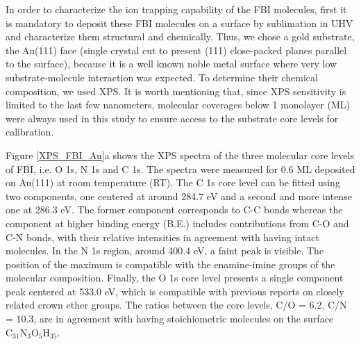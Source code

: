 \documentclass[aps,prl,reprint,longbibliography,superscriptaddress, english]{revtex4-1}
\begin{document}
In order to characterize the ion trapping capability of the FBI molecules, first it is mandatory to deposit these FBI molecules on a surface by sublimation in UHV and characterize them structural and chemically. Thus, we chose a gold substrate, the Au(111) face (single crystal cut to present (111) close-packed planes parallel to the surface), because it is a well known noble metal surface where very low substrate-molecule interaction was expected. To determine their chemical composition, we used XPS. It is worth mentioning that, since XPS sensitivity is limited to the last few nanometers, molecular coverages below 1 monolayer (ML) were always used in this study to ensure access to the substrate core levels for calibration. 

Figure {\ref{XPS_FBI_Au}}a shows the XPS spectra of the three molecular core levels of FBI, i.e. O 1s, N 1s and C 1s. The spectra were measured for 0.6 ML deposited on Au(111) at room temperature (RT). The C 1s core level can be fitted using two components, one {centered} at around 284.7 eV and a second and more intense one at 286.3 eV. The former component corresponds to C-C bonds whereas the component at higher binding energy (B.E.) includes contributions from C-O and C-N bonds, with their relative intensities in agreement with having intact molecules. In the N 1s region, around 400.4 eV, a faint peak is visible. The position of the maximum is compatible with the {enamine-imine} groups of the molecular composition. Finally, the O 1s core level presents a single component peak centered at 533.0 eV, which is compatible with previous reports on closely related crown ether groups\cite{stredansky_-surface_2019}. The ratios between the core levels, C/O = 6.2, C/N = 10.3, are in agreement with having stoichiometric molecules on the surface $ \mathrm{C_{31}N_{3}O_{5}H_{35}}$. 
\end{document}
